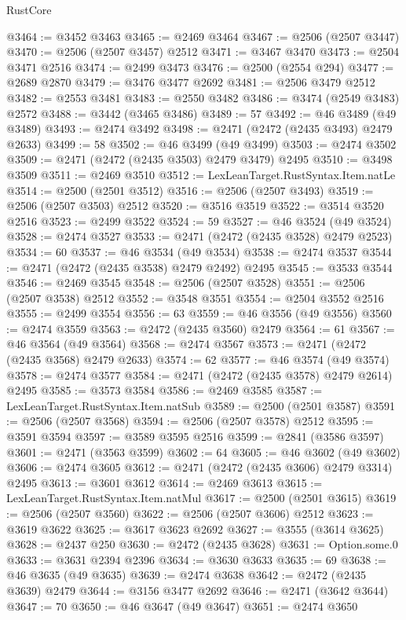 \begin{lexlean}{RustCore}
\begin{coremodule}
@3464 := @3452 @3463
@3465 := @2469 @3464
@3467 := @2506 (@2507 @3447)
@3470 := @2506 (@2507 @3457) @2512
@3471 := @3467 @3470
@3473 := @2504 @3471 @2516
@3474 := @2499 @3473
@3476 := @2500 (@2554 @294)
@3477 := @2689 @2870
@3479 := @3476 @3477 @2692
@3481 := @2506 @3479 @2512
@3482 := @2553 @3481
@3483 := @2550 @3482
@3486 := @3474 (@2549 @3483) @2572
@3488 := @3442 (@3465 @3486)
@3489 := 57
@3492 := @46 @3489 (@49 @3489)
@3493 := @2474 @3492
@3498 := @2471 (@2472 (@2435 @3493) @2479 @2633)
@3499 := 58
@3502 := @46 @3499 (@49 @3499)
@3503 := @2474 @3502
@3509 := @2471 (@2472 (@2435 @3503) @2479 @3479) @2495
@3510 := @3498 @3509
@3511 := @2469 @3510
@3512 := LexLeanTarget.RustSyntax.Item.natLe
@3514 := @2500 (@2501 @3512)
@3516 := @2506 (@2507 @3493)
@3519 := @2506 (@2507 @3503) @2512
@3520 := @3516 @3519
@3522 := @3514 @3520 @2516
@3523 := @2499 @3522
@3524 := 59
@3527 := @46 @3524 (@49 @3524)
@3528 := @2474 @3527
@3533 := @2471 (@2472 (@2435 @3528) @2479 @2523)
@3534 := 60
@3537 := @46 @3534 (@49 @3534)
@3538 := @2474 @3537
@3544 := @2471 (@2472 (@2435 @3538) @2479 @2492) @2495
@3545 := @3533 @3544
@3546 := @2469 @3545
@3548 := @2506 (@2507 @3528)
@3551 := @2506 (@2507 @3538) @2512
@3552 := @3548 @3551
@3554 := @2504 @3552 @2516
@3555 := @2499 @3554
@3556 := 63
@3559 := @46 @3556 (@49 @3556)
@3560 := @2474 @3559
@3563 := @2472 (@2435 @3560) @2479
@3564 := 61
@3567 := @46 @3564 (@49 @3564)
@3568 := @2474 @3567
@3573 := @2471 (@2472 (@2435 @3568) @2479 @2633)
@3574 := 62
@3577 := @46 @3574 (@49 @3574)
@3578 := @2474 @3577
@3584 := @2471 (@2472 (@2435 @3578) @2479 @2614) @2495
@3585 := @3573 @3584
@3586 := @2469 @3585
@3587 := LexLeanTarget.RustSyntax.Item.natSub
@3589 := @2500 (@2501 @3587)
@3591 := @2506 (@2507 @3568)
@3594 := @2506 (@2507 @3578) @2512
@3595 := @3591 @3594
@3597 := @3589 @3595 @2516
@3599 := @2841 (@3586 @3597)
@3601 := @2471 (@3563 @3599)
@3602 := 64
@3605 := @46 @3602 (@49 @3602)
@3606 := @2474 @3605
@3612 := @2471 (@2472 (@2435 @3606) @2479 @3314) @2495
@3613 := @3601 @3612
@3614 := @2469 @3613
@3615 := LexLeanTarget.RustSyntax.Item.natMul
@3617 := @2500 (@2501 @3615)
@3619 := @2506 (@2507 @3560)
@3622 := @2506 (@2507 @3606) @2512
@3623 := @3619 @3622
@3625 := @3617 @3623 @2692
@3627 := @3555 (@3614 @3625)
@3628 := @2437 @250
@3630 := @2472 (@2435 @3628)
@3631 := Option.some.{0}
@3633 := @3631 @2394 @2396
@3634 := @3630 @3633
@3635 := 69
@3638 := @46 @3635 (@49 @3635)
@3639 := @2474 @3638
@3642 := @2472 (@2435 @3639) @2479
@3644 := @3156 @3477 @2692
@3646 := @2471 (@3642 @3644)
@3647 := 70
@3650 := @46 @3647 (@49 @3647)
@3651 := @2474 @3650

\end{coremodule}
\end{lexlean}
